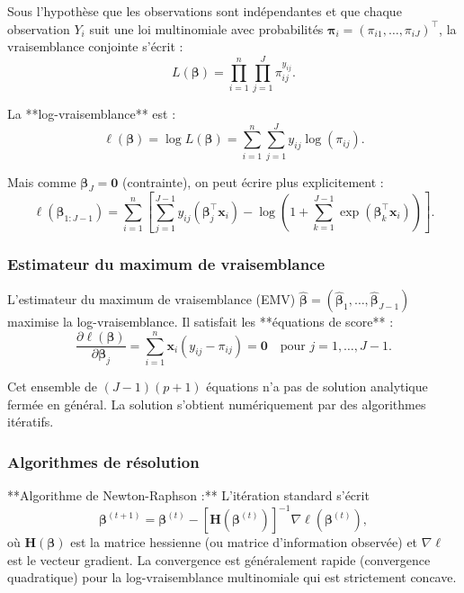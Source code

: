 \documentclass[12pt,a4paper]{article}
\begin{document}
Sous l'hypothèse que les observations sont indépendantes et que chaque observation $Y_i$ suit une loi multinomiale avec probabilités $\boldsymbol{\pi}_i = (\pi_{i1}, \dots, \pi_{iJ})^\top$, la vraisemblance conjointe s'écrit :
\begin{equation}
L(\boldsymbol{\beta}) = \prod_{i=1}^{n} \prod_{j=1}^{J} \pi_{ij}^{y_{ij}}.
\end{equation}

La **log-vraisemblance** est :
\begin{equation}\label{eq:loglikelihood}
\ell(\boldsymbol{\beta}) = \log L(\boldsymbol{\beta}) = \sum_{i=1}^{n}\sum_{j=1}^{J} y_{ij}\log(\pi_{ij}).
\end{equation}

Mais comme $\boldsymbol{\beta}_J = \mathbf{0}$ (contrainte), on peut écrire plus explicitement :
\begin{equation}\label{eq:loglikelihood-constrained}
\ell(\boldsymbol{\beta}_{1:J-1}) = \sum_{i=1}^{n} \left[ \sum_{j=1}^{J-1} y_{ij} (\boldsymbol{\beta}_j^\top \mathbf{x}_i) - \log\left(1 + \sum_{k=1}^{J-1}\exp(\boldsymbol{\beta}_k^\top \mathbf{x}_i)\right) \right].
\end{equation}

\subsubsection{Estimateur du maximum de vraisemblance}

L'estimateur du maximum de vraisemblance (EMV) $\widehat{\boldsymbol{\beta}} = (\widehat{\boldsymbol{\beta}}_1, \dots, \widehat{\boldsymbol{\beta}}_{J-1})$ maximise la log-vraisemblance. Il satisfait les **équations de score** :
\begin{equation}\label{eq:score}
\frac{\partial \ell(\boldsymbol{\beta})}{\partial \boldsymbol{\beta}_j} = \sum_{i=1}^{n} \mathbf{x}_i (y_{ij} - \pi_{ij}) = \mathbf{0} \quad \text{pour } j=1,\dots,J-1.
\end{equation}

Cet ensemble de $(J-1)(p+1)$ équations n'a pas de solution analytique fermée en général. La solution s'obtient numériquement par des algorithmes itératifs.

\subsubsection{Algorithmes de résolution}

**Algorithme de Newton-Raphson :** L'itération standard s'écrit
\begin{equation}
\boldsymbol{\beta}^{(t+1)} = \boldsymbol{\beta}^{(t)} - \left[ \mathbf{H}(\boldsymbol{\beta}^{(t)}) \right]^{-1} \nabla \ell(\boldsymbol{\beta}^{(t)}),
\end{equation}
où $\mathbf{H}(\boldsymbol{\beta})$ est la matrice hessienne (ou matrice d'information observée) et $\nabla \ell$ est le vecteur gradient. La convergence est généralement rapide (convergence quadratique) pour la log-vraisemblance multinomiale qui est strictement concave.
\end{document}
